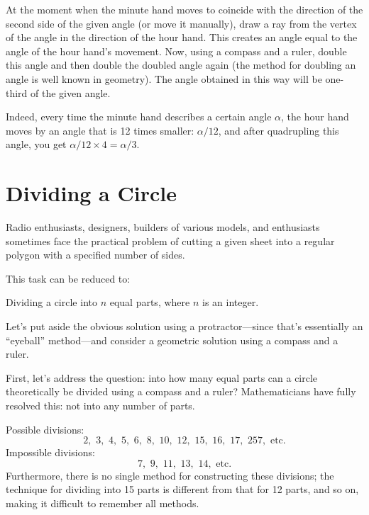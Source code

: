At the moment when the minute hand moves to coincide with the direction of the second side of the given angle (or move it manually), draw a ray from the vertex of the angle in the direction of the hour hand. This creates an angle equal to the angle of the hour hand’s movement. Now, using a compass and a ruler, double this angle and then double the doubled angle again (the method for doubling an angle is well known in geometry). The angle obtained in this way will be one-third of the given angle.

Indeed, every time the minute hand describes a certain angle \( \alpha \), the hour hand moves by an angle that is 12 times smaller: \( \alpha/12 \), and after quadrupling this angle, you get \( \alpha/12 \times 4 = \alpha/3 \).



\section{Dividing a Circle}
\label{sec-10.6}

Radio enthusiasts, designers, builders of various models, and enthusiasts sometimes face the practical problem of cutting a given sheet into a regular polygon with a specified number of sides.

This task can be reduced to:

Dividing a circle into \( n \) equal parts, where \( n \) is an integer.



Let's put aside the obvious solution using a protractor—since that's essentially an ``eyeball'' method—and consider a geometric solution using a compass and a ruler.

First, let's address the question: into how many equal parts can a circle theoretically be divided using a compass and a ruler? Mathematicians have fully resolved this: not into any number of parts.

Possible divisions: 
\begin{equation*}%
2,\,\, 3, \,\, 4, \,\, 5, \,\, 6, \,\, 8, \,\, 10,  \,\, 12, \,\, 15, \,\, 16, \,\, 17, \,\,  257, \,\, \text{etc.}
\end{equation*}
Impossible divisions: 
\begin{equation*}%
7,\,\, 9, \,\, 11, \,\, 13, \,\, 14, \,\, \text{etc.}
\end{equation*}
Furthermore, there is no single method for constructing these divisions; the technique for dividing into 15 parts is different from that for 12 parts, and so on, making it difficult to remember all methods.

